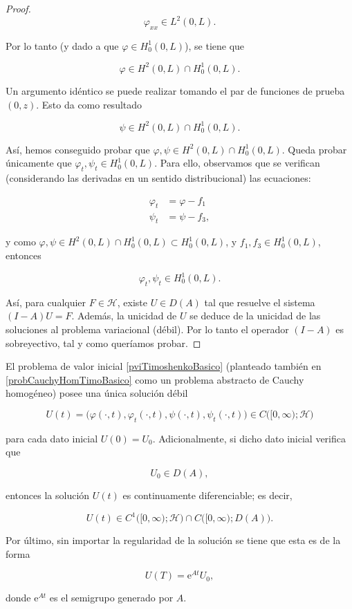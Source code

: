 \begin{proof}
    \[\varphi_{xx} \in L^2(0,L).\]

    Por lo tanto (y dado a que $\varphi \in H_0^1(0,L)$), se tiene que

    \[\varphi \in H^2(0,L) \cap H_0^1(0,L).\]

    Un argumento idéntico se puede realizar tomando el par de funciones de prueba $ (0,z)$. Esto da como resultado

    \[\psi \in H^2(0,L) \cap H_0^1(0,L).\]

    Así, hemos conseguido probar que $\varphi, \psi \in H^2(0,L) \cap H_0^1(0,L)$. Queda probar únicamente que $\varphi_t, \psi_t \in H_0^1(0,L)$. Para ello, observamos que se verifican (considerando las derivadas en un sentido distribucional) las ecuaciones:

    \begin{align*}
        \varphi_t &= \varphi - f_1\\
        \psi_t &= \psi - f_3,
    \end{align*}

    y como $\varphi, \psi \in H^2(0,L) \cap H_0^1(0,L) \subset H_0^1(0,L)$, y $f_1, f_3 \in H_0^1(0,L)$, entonces

    \[\varphi_t, \psi_t \in H_0^1(0,L).\]

    Así, para cualquier $F \in \mathcal{H}$, existe $U \in D(A)$ tal que resuelve el sistema $(I-A)U = F$. Además, la unicidad de $U$ se deduce de la unicidad de las soluciones al problema variacional (débil). Por lo tanto el operador $(I-A)$ es sobreyectivo, tal y como queríamos probar.
\end{proof}

\begin{Teorema}
\label{ch:teoriaVigas:prop:existenciaYUnicidad}
    El problema de valor inicial \eqref{pviTimoshenkoBasico} (planteado también en \eqref{probCauchyHomTimoBasico} como un problema abstracto de Cauchy homogéneo) posee una única solución débil

    \[U(t) = \big(\varphi(\cdot, t), \varphi_t(\cdot, t), \psi(\cdot, t), \psi_t(\cdot, t)\big) \in C\big([0,\infty);\mathcal{H}\big)\]

    para cada dato inicial $U(0) = U_0$. Adicionalmente, si dicho dato inicial verifica que

    \[U_0 \in D(A),\]

    entonces la solución $U(t)$ es continuamente diferenciable; es decir,

    \todo[inline]{Añadir explicación sobre por qué $C^1\big([0,\infty);\mathcal{H}\big) \cap C\big([0,\infty) ; D(A)\big)$}
    \[U(t) \in C^1\big([0,\infty);\mathcal{H}\big) \cap C\big([0,\infty) ; D(A)\big).\]

    Por último, sin importar la regularidad de la solución se tiene que esta es de la forma

    \[U(T) = \mathrm{e}^{At}U_0,\]

    donde $\mathrm{e}^{At}$ es el semigrupo generado por $A$.
\end{Teorema}


